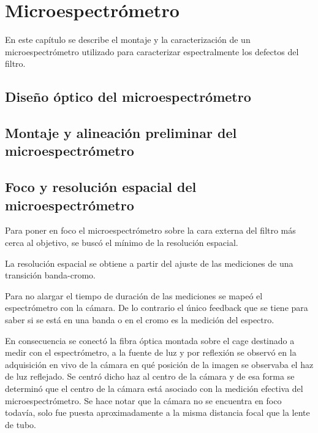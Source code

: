 \singlespacing
\chapter{Microespectrómetro}

\hspace{0.5cm}En este capítulo se describe el montaje y la caracterización de un microespectrómetro utilizado para caracterizar espectralmente los defectos del filtro.



\singlespacing
\section*{Diseño óptico del microespectrómetro}

\singlespacing
\section*{Montaje y alineación preliminar del microespectrómetro}

\singlespacing
\section*{Foco y resolución espacial del microespectrómetro}

\hspace{0.5cm}Para poner en foco el microespectrómetro sobre la cara externa del filtro más cerca al objetivo, se buscó el mínimo de la resolución espacial.

La resolución espacial se obtiene a partir del ajuste de las mediciones de una transición banda-cromo.

Para no alargar el tiempo de duración de las mediciones se mapeó el espectrómetro con la cámara. De lo contrario el único feedback que se tiene para saber si se está en una banda o en el cromo es la medición del espectro.

En consecuencia se conectó la fibra óptica montada sobre el cage destinado a medir con el espectrómetro, a la fuente de luz y por reflexión se observó en la adquisición en vivo de la cámara en qué posición de la imagen se observaba el haz de luz reflejado. Se centró dicho haz al centro de la cámara y de esa forma se determinó que el centro de la cámara está asociado con la medición efectiva del microespectrómetro. Se hace notar que la cámara no se encuentra en foco todavía, solo fue puesta aproximadamente a la misma distancia focal que la lente de tubo.

